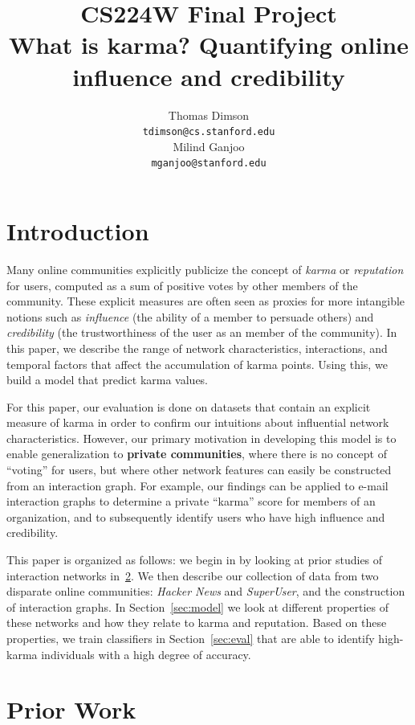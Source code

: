 \documentclass[11pt]{article}
\title{{\small CS224W Final Project} \\ What is karma? Quantifying online influence and credibility}
\author{Thomas Dimson \\
  {\tt tdimson@cs.stanford.edu}
  \\\And
  Milind Ganjoo \\
  {\tt mganjoo@stanford.edu}
}
\date{}
\begin{document}
\maketitle

\newcommand{\citet}[1]{\cite{#1}}

\section{Introduction}

Many online communities explicitly publicize the concept of \textit{karma} or
\textit{reputation} for users, computed as a sum of positive votes by other members of
the community. These explicit measures are often seen as proxies for more
intangible notions such as \textit{influence} (the ability of a member to
persuade others) and \textit{credibility} (the trustworthiness of the user as an
member of the community). In this paper, we describe the range of network
characteristics, interactions, and temporal factors that affect the accumulation
of karma points. Using this, we build a model that predict karma values.

For this paper, our evaluation is done on datasets that contain an explicit
measure of karma in order to confirm our intuitions about influential network
characteristics. However, our primary motivation in developing this model is to
enable generalization to \textbf{private communities}, where there is no concept
of ``voting'' for users, but where other network features can easily be
constructed from an interaction graph.  For example, our findings can be applied
to e-mail interaction graphs to determine a private ``karma'' score for members
of an organization, and to subsequently identify users who have high influence
and credibility.

This paper is organized as follows: we begin in by looking at prior studies of
interaction networks in~\ref{sec:prior}. We then describe our collection of data
from two disparate online communities: \textit{Hacker News} and
\textit{SuperUser}, and the construction of interaction graphs. In
Section~\ref{sec:model} we look at different properties of these networks and
how they relate to karma and reputation. Based on these properties, we train
classifiers in Section~\ref{sec:eval} that are able to identify high-karma
individuals with a high degree of accuracy.

\section{Prior Work}
\label{sec:prior}
\end{document}
